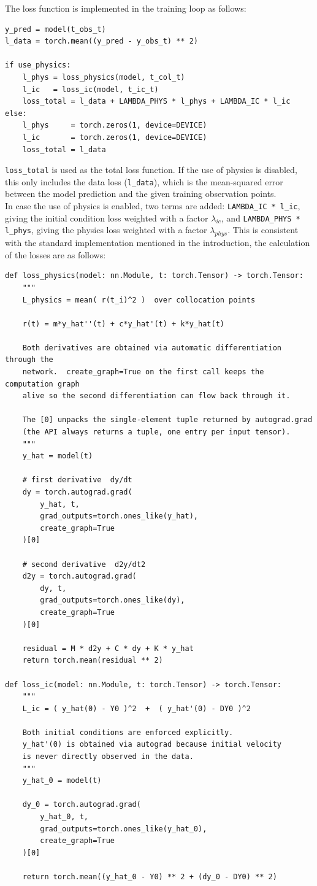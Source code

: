 \documentclass[12pt, a4paper]{report}
\begin{document}
The loss function is implemented in the training loop as follows: 
\begin{verbatim}
y_pred = model(t_obs_t)
l_data = torch.mean((y_pred - y_obs_t) ** 2)

if use_physics:
    l_phys = loss_physics(model, t_col_t)
    l_ic   = loss_ic(model, t_ic_t)
    loss_total = l_data + LAMBDA_PHYS * l_phys + LAMBDA_IC * l_ic
else:
    l_phys     = torch.zeros(1, device=DEVICE)
    l_ic       = torch.zeros(1, device=DEVICE)
    loss_total = l_data 
\end{verbatim}
\verb|loss_total| is used as the total loss function. If the use of physics is disabled, this only includes the data loss (\verb|l_data|), which is the mean-squared error between the model prediction and the given training observation points.\\
In case the use of physics is enabled, two terms are added: \verb|LAMBDA_IC * l_ic|, giving the initial condition loss weighted with a factor $\lambda_{ic}$, and \verb|LAMBDA_PHYS * l_phys|, giving the physics loss weighted with a factor $\lambda_{phys}$. This is consistent with the standard implementation mentioned in the introduction, the calculation of the losses are as follows:
\begin{verbatim}
def loss_physics(model: nn.Module, t: torch.Tensor) -> torch.Tensor:
    """
    L_physics = mean( r(t_i)^2 )  over collocation points

    r(t) = m*y_hat''(t) + c*y_hat'(t) + k*y_hat(t)

    Both derivatives are obtained via automatic differentiation through the
    network.  create_graph=True on the first call keeps the computation graph
    alive so the second differentiation can flow back through it.

    The [0] unpacks the single-element tuple returned by autograd.grad
    (the API always returns a tuple, one entry per input tensor).
    """
    y_hat = model(t)

    # first derivative  dy/dt
    dy = torch.autograd.grad(
        y_hat, t,
        grad_outputs=torch.ones_like(y_hat),
        create_graph=True
    )[0]

    # second derivative  d2y/dt2
    d2y = torch.autograd.grad(
        dy, t,
        grad_outputs=torch.ones_like(dy),
        create_graph=True
    )[0]

    residual = M * d2y + C * dy + K * y_hat
    return torch.mean(residual ** 2)

def loss_ic(model: nn.Module, t: torch.Tensor) -> torch.Tensor:
    """
    L_ic = ( y_hat(0) - Y0 )^2  +  ( y_hat'(0) - DY0 )^2

    Both initial conditions are enforced explicitly.
    y_hat'(0) is obtained via autograd because initial velocity
    is never directly observed in the data.
    """
    y_hat_0 = model(t)

    dy_0 = torch.autograd.grad(
        y_hat_0, t,
        grad_outputs=torch.ones_like(y_hat_0),
        create_graph=True
    )[0]

    return torch.mean((y_hat_0 - Y0) ** 2 + (dy_0 - DY0) ** 2)
\end{verbatim}
\end{document}
